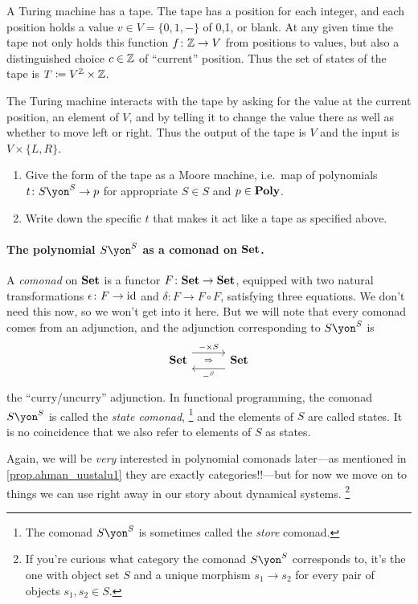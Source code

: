 \documentclass[DynamicalBook]{subfiles}
\begin{document}
\begin{exercise}
A Turing machine has a tape. The tape has a position for each integer, and each position holds a value $v\in V=\{0,1,-\}$ of 0,1, or blank. At any given time the tape not only holds this function $f\colon\mathbb{Z}\to V$ from positions to values, but also a distinguished choice $c\in\mathbb{Z}$ of ``current'' position. Thus the set of states of the tape is $T\coloneqq V^{\mathbb{Z}}\times\mathbb{Z}$.

The Turing machine interacts with the tape by asking for the value at the current position, an element of $V$, and by telling it to change the value there as well as whether to move left or right. Thus the output of the tape is $V$ and the input is $V\times\{L,R\}$.

\begin{enumerate}
	\item Give the form of the tape as a Moore machine, i.e.\ map of polynomials $t\colon S\yon^S\to p$ for appropriate $S\in S$ and $p\in\textbf{Poly}$.
	\item Write down the specific $t$ that makes it act like a tape as specified above.
\qedhere
\end{enumerate}
\end{exercise}

\paragraph{The polynomial $S\yon^S$ as a comonad on $\textbf{Set}$.}\label{page.poly_comonad}

A \emph{comonad} on $\textbf{Set}$ is a functor $F\colon\textbf{Set}\to\textbf{Set}$, equipped with two natural transformations $\epsilon\colon F\to\mathrm{id}$ and $\delta\colon F\to F\circ F$, satisfying three equations. We don't need this now, so we won't get into it here. But we will note that every comonad comes from an adjunction, and the adjunction corresponding to $S\yon^S$ is
\[
\adj{\smset}{-\times S}{-^S}{\smset}
\]
the ``curry/uncurry'' adjunction. In functional programming, the comonad $S\yon^S$ is called the \emph{state comonad},%
\footnote{The comonad $S\yon^S$ is sometimes called the \emph{store} comonad.} 
and the elements of $S$ are called states. It is no coincidence that we also refer to elements of $S$ as states. 

Again, we will be \emph{very} interested in polynomial comonads later---as mentioned in \cref{prop.ahman_uustalu1} they are exactly categories!!---but for now we move on to things we can use right away in our story about dynamical systems.%
\footnote{If you're curious what category the comonad $S\yon^S$ corresponds to, it's the one with object set $S$ and a unique morphism $s_1\to s_2$ for every pair of objects $s_1,s_2\in S$.}
\end{document}
